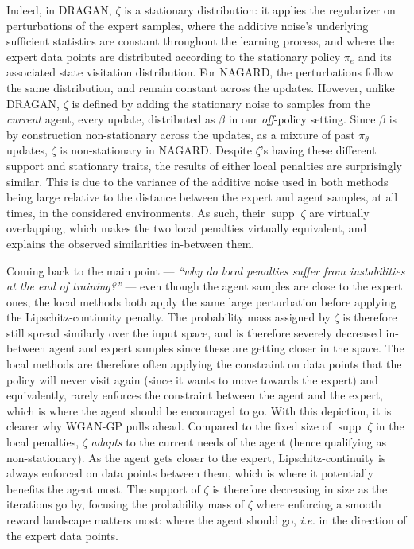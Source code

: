 Indeed, in DRAGAN, $\zeta$ is a stationary distribution:
it applies the regularizer on perturbations
of the expert samples,
where the additive noise's underlying sufficient statistics are constant
throughout the learning process,
and where the expert data points are distributed
according to the stationary policy $\pi_e$ and its associated state visitation distribution.
For NAGARD, the perturbations follow the same distribution,
and remain constant across the updates.
However, unlike DRAGAN, $\zeta$ is defined by adding the stationary noise
to samples from the \emph{current} agent, every update,
distributed as $\beta$ in our \emph{off}-policy setting.
Since $\beta$ is by construction non-stationary across the updates,
as a mixture of past $\pi_\theta$ updates,
$\zeta$ is non-stationary in NAGARD.
Despite $\zeta$'s having these different support and stationary traits,
the results of either local penalties are surprisingly similar.
This is due to the variance of the additive noise used in both methods
being large relative to the distance between the expert and agent samples,
at all times, in the considered environments.
As such, their $\operatorname{supp} \; \zeta$ are virtually overlapping,
which makes the two local penalties virtually equivalent,
and explains the observed similarities in-between them.

Coming back to the main point
--- \textit{``why do local penalties suffer from instabilities at the end of training?''} ---
even though the agent samples are close to the expert ones,
the local methods both apply the same large perturbation before applying the
Lipschitz-continuity penalty.
The probability mass assigned by $\zeta$ is therefore still spread similarly
over the input space, and is therefore severely decreased
in-between agent and expert samples since these are getting closer in the space.
The local methods are therefore often applying the constraint
on data points that the policy will never visit again (since it
wants to move towards the expert) and equivalently, rarely
enforces the constraint between the agent and the expert, which is where
the agent should be encouraged to go.
With this depiction, it is clearer why WGAN-GP pulls ahead.
Compared to the fixed size of $\operatorname{supp} \; \zeta$ in the local penalties,
$\zeta$ \emph{adapts} to the current needs of the agent (hence qualifying as non-stationary).
As the agent gets closer to the expert, Lipschitz-continuity is always
enforced on data points between them, which is where it potentially benefits the agent most.
The support of $\zeta$ is therefore decreasing in size as the iterations go by,
focusing the probability mass of $\zeta$ where enforcing a smooth reward landscape
matters most: where the agent should go, \textit{i.e.} in the direction of the expert data points.

